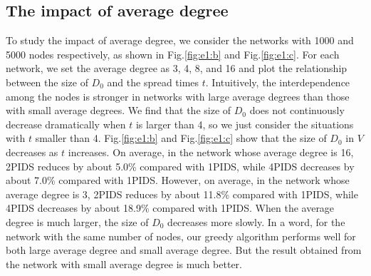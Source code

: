 \subsection{The impact of average degree}
To study the impact of average degree, we consider the networks with 1000 and 5000 nodes respectively, as shown in  Fig.\ref{fig:e1:b} and Fig.\ref{fig:e1:c}. For each network, we set the average degree as 3, 4, 8, and 16 and plot the relationship between the size of $D_0$ and the spread times $t$. Intuitively, the interdependence among the nodes is stronger in networks with large average degrees than those with small average degrees. We find that the size of $D_0$ does not continuously decrease dramatically when $t$ is larger than 4, so we just consider the situations with $t$ smaller than 4. Fig.\ref{fig:e1:b} and Fig.\ref{fig:e1:c} show that the size of $D_0$ in $V$ decreases as $t$ increases. On average, in the network whose average degree is 16, 2PIDS reduces by about 5.0\% compared with 1PIDS, while 4PIDS decreases by about 7.0\% compared with 1PIDS. However, on average, in the network whose average degree is 3, 2PIDS reduces by about 11.8\% compared with 1PIDS, while 4PIDS decreases by about 18.9\% compared with 1PIDS. When the average degree is much larger, the size of $D_0$ decreases more slowly.
In a word, for the network with the same number of nodes, our greedy algorithm performs well for both large average degree and small average degree. But the result obtained from the network with small average degree is much better.

